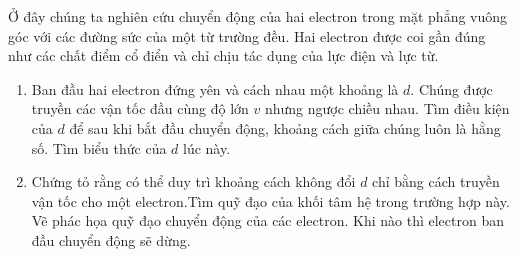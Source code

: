 \begin{vd}
Ở đây chúng ta nghiên cứu chuyển động của hai electron trong mặt phẳng vuông góc với các đường sức của một từ trường đều. Hai electron được coi gần đúng như các chất điểm cổ điển và chỉ chịu tác dụng của lực điện và lực từ.
\begin{enumerate}[1)]
    \item Ban đầu hai electron đứng yên và cách nhau một khoảng là $d$. Chúng được truyền các vận tốc đầu cùng độ lớn $v$ nhưng ngược chiều nhau. Tìm điều kiện của $d$ để sau khi bắt đầu chuyển động, khoảng cách giữa chúng luôn là hằng số. Tìm biểu thức của $d$ lúc này.
    \item Chứng tỏ rằng có thể duy trì khoảng cách không đổi $d$ chỉ bằng cách truyền vận tốc cho một electron.Tìm quỹ đạo của khối tâm hệ trong trường hợp này. Vẽ phác họa quỹ đạo chuyển động của các electron. Khi nào thì electron ban đầu chuyển động sẽ dừng.
\end{enumerate}
\end{vd}
